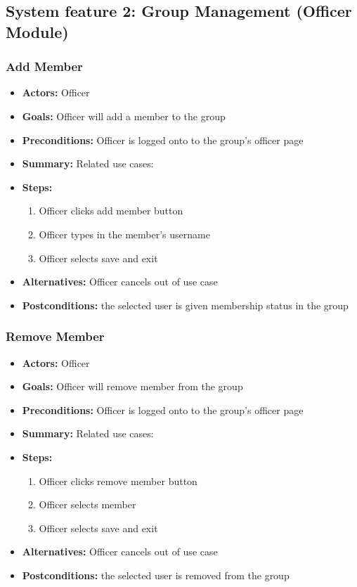 		\subsection{System feature 2: Group Management (Officer Module)}
			\subsubsection{Add Member}
			\begin{itemize}
				\item{\textbf{Actors:} Officer}
				\item{\textbf{Goals:} Officer will add a member to the group}
				\item{\textbf{Preconditions:} Officer is logged onto to the group's officer page}
				\item{\textbf{Summary:} Related use cases:}
				\item{\textbf{Steps:}
				\begin{enumerate}
					\item{Officer clicks add member button}
					\item{Officer types in the member's username}
					\item{Officer selects save and exit}
				\end{enumerate}
				}
				\item{\textbf{Alternatives:} Officer cancels out of use case}
				\item{\textbf{Postconditions:} the selected user is given membership status in the group}
			\end{itemize}
			\subsubsection{Remove Member}
			\begin{itemize}
				\item{\textbf{Actors:} Officer}
				\item{\textbf{Goals:} Officer will remove member from the group}
				\item{\textbf{Preconditions:} Officer is logged onto to the group's officer page}
				\item{\textbf{Summary:} Related use cases:}
				\item{\textbf{Steps:}
				\begin{enumerate}
					\item{Officer clicks remove member button}
					\item{Officer selects member}
					\item{Officer selects save and exit}
				\end{enumerate}
				}
				\item{\textbf{Alternatives:} Officer cancels out of use case}
				\item{\textbf{Postconditions:} the selected user is removed from the group}
			\end{itemize}

